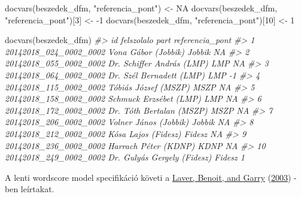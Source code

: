 \documentclass[
]{book}
\newenvironment{Shaded}{\begin{snugshade}}{\end{snugshade}}
\newcommand{\CommentTok}[1]{\textcolor[rgb]{0.56,0.35,0.01}{\textit{#1}}}
\newcommand{\ConstantTok}[1]{\textcolor[rgb]{0.00,0.00,0.00}{#1}}
\newcommand{\DecValTok}[1]{\textcolor[rgb]{0.00,0.00,0.81}{#1}}
\newcommand{\FunctionTok}[1]{\textcolor[rgb]{0.00,0.00,0.00}{#1}}
\newcommand{\NormalTok}[1]{#1}
\newcommand{\OtherTok}[1]{\textcolor[rgb]{0.56,0.35,0.01}{#1}}
\newcommand{\SpecialCharTok}[1]{\textcolor[rgb]{0.00,0.00,0.00}{#1}}
\newcommand{\StringTok}[1]{\textcolor[rgb]{0.31,0.60,0.02}{#1}}
\begin{document}
\begin{Shaded}
\begin{Highlighting}[]

\FunctionTok{docvars}\NormalTok{(beszedek\_dfm, }\StringTok{"referencia\_pont"}\NormalTok{) }\OtherTok{\textless{}{-}} \ConstantTok{NA}
\FunctionTok{docvars}\NormalTok{(beszedek\_dfm, }\StringTok{"referencia\_pont"}\NormalTok{)[}\DecValTok{3}\NormalTok{] }\OtherTok{\textless{}{-}} \SpecialCharTok{{-}}\DecValTok{1}
\FunctionTok{docvars}\NormalTok{(beszedek\_dfm, }\StringTok{"referencia\_pont"}\NormalTok{)[}\DecValTok{10}\NormalTok{] }\OtherTok{\textless{}{-}} \DecValTok{1}

\FunctionTok{docvars}\NormalTok{(beszedek\_dfm)}
\CommentTok{\#\textgreater{}                        id                  felszolalo   part referencia\_pont}
\CommentTok{\#\textgreater{} 1  20142018\_024\_0002\_0002         Vona Gábor (Jobbik) Jobbik              NA}
\CommentTok{\#\textgreater{} 2  20142018\_055\_0002\_0002   Dr. Schiffer András (LMP)    LMP              NA}
\CommentTok{\#\textgreater{} 3  20142018\_064\_0002\_0002    Dr. Szél Bernadett (LMP)    LMP              {-}1}
\CommentTok{\#\textgreater{} 4  20142018\_115\_0002\_0002        Tóbiás József (MSZP)   MSZP              NA}
\CommentTok{\#\textgreater{} 5  20142018\_158\_0002\_0002      Schmuck Erzsébet (LMP)    LMP              NA}
\CommentTok{\#\textgreater{} 6  20142018\_172\_0002\_0002    Dr. Tóth Bertalan (MSZP)   MSZP              NA}
\CommentTok{\#\textgreater{} 7  20142018\_206\_0002\_0002       Volner János (Jobbik) Jobbik              NA}
\CommentTok{\#\textgreater{} 8  20142018\_212\_0002\_0002         Kósa Lajos (Fidesz) Fidesz              NA}
\CommentTok{\#\textgreater{} 9  20142018\_236\_0002\_0002        Harrach Péter (KDNP)   KDNP              NA}
\CommentTok{\#\textgreater{} 10 20142018\_249\_0002\_0002 Dr. Gulyás Gergely (Fidesz) Fidesz               1}
\end{Highlighting}
\end{Shaded}

A lenti wordscore model specifikáció követi a
\protect\hyperlink{ref-laver2003extracting}{Laver, Benoit, and Garry}
(\protect\hyperlink{ref-laver2003extracting}{2003}) - ben leírtakat.
\end{document}

